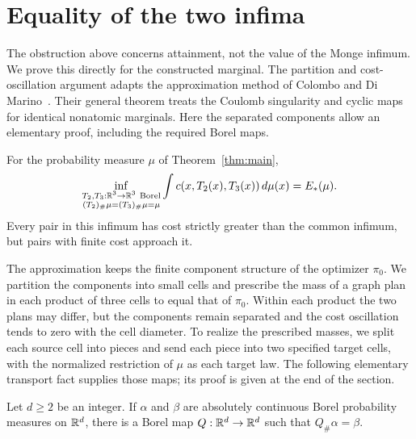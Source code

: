 \section{Equality of the two infima}\label{sec:infima}

The obstruction above concerns attainment, not the value of the Monge
infimum. We prove this directly for the constructed marginal. The
partition and cost-oscillation argument adapts the approximation method
of Colombo and Di Marino~\cite[author version, Lemma~2.3 and proof of
Theorem~2.1]{CDM2015}. Their general theorem treats the Coulomb singularity
and cyclic maps for identical nonatomic marginals. Here the separated
components allow an elementary proof, including the required Borel maps.

\begin{proposition}\label{prop:equal-infima}
For the probability measure \(\mu\) of Theorem~\ref{thm:main},
\[
 \inf_{\substack{T_2,T_3:\R^3\to\R^3\ \mathrm{Borel}\\
                 (T_2)_\#\mu=(T_3)_\#\mu=\mu}}
 \int c(x,T_2(x),T_3(x))\dd\mu(x)=\E(\mu).
\]
Every pair in this infimum has cost strictly greater than the common
infimum, but pairs with finite cost approach it.
\end{proposition}

The approximation keeps the finite component structure of the optimizer
\(\pi_0\). We partition the components into small cells and prescribe the
mass of a graph plan in each product of three cells to equal that of
\(\pi_0\). Within each product the two plans may differ, but the components
remain separated and the cost oscillation tends to zero with the cell
diameter. To realize the prescribed masses, we split each source cell
into pieces and send each piece into two specified target cells, with
the normalized restriction of \(\mu\) as each target law.
The following elementary transport fact supplies those maps; its proof
is given at the end of the section.

\begin{lemma}\label{lem:borel-transport}
Let \(d\ge2\) be an integer. If \(\alpha\) and \(\beta\) are absolutely
continuous Borel probability measures on \(\mathbb R^d\), there is a Borel map
\(Q:\mathbb R^d\to\mathbb R^d\) such that \(Q_\#\alpha=\beta\).
\end{lemma}

